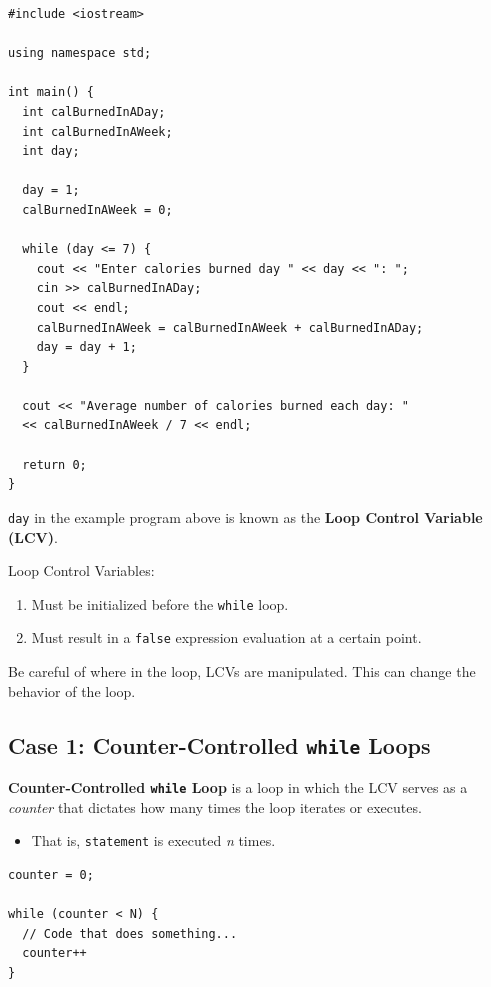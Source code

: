 \documentclass{article}
\begin{document}
\begin{lstlisting}[caption={\texttt{while} Loop Example Program}]
#include <iostream>

using namespace std;

int main() {
  int calBurnedInADay;
  int calBurnedInAWeek;
  int day;

  day = 1;
  calBurnedInAWeek = 0;

  while (day <= 7) {
    cout << "Enter calories burned day " << day << ": ";
    cin >> calBurnedInADay;
    cout << endl;
    calBurnedInAWeek = calBurnedInAWeek + calBurnedInADay;
    day = day + 1;
  }
   
  cout << "Average number of calories burned each day: "
  << calBurnedInAWeek / 7 << endl;

  return 0;
}
\end{lstlisting}

\texttt{day} in the example program above is known as the \textbf{Loop Control
Variable (LCV)}.

\vspace{8pt}
Loop Control Variables:

\begin{enumerate}
    \item Must be initialized before the \texttt{while} loop.
    \item Must result in a \texttt{false} expression evaluation at a certain point.
\end{enumerate}

Be careful of where in the loop, LCVs are manipulated. This can change the behavior of the loop.

\subsection{Case 1: Counter-Controlled \texttt{while} Loops}
\textbf{Counter-Controlled \texttt{while} Loop} is a loop in
which the LCV serves as a \textit{counter} that dictates how many times the loop iterates or executes.
\begin{itemize}
  \item That is, \texttt{statement} is executed \textit{n} times.
\end{itemize}

\begin{lstlisting}[caption={Counter-Controlled \texttt{while} Loop
  Example}]
counter = 0;

while (counter < N) {
  // Code that does something...
  counter++
}
\end{lstlisting}
\end{document}
